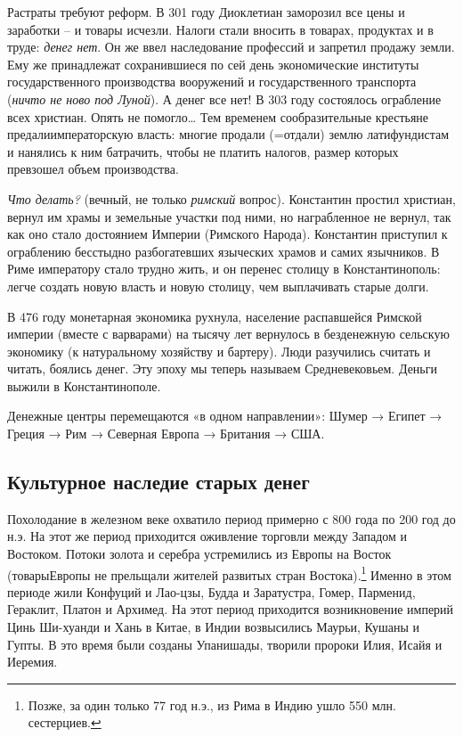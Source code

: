 Растраты требуют \flqq реформ\frqq. В 301 году Диоклетиан заморозил все цены и заработки – и товары
исчезли. Налоги стали вносить в товарах, продуктах и в труде: \flqq \textit{денег нет}\frqq. Он же
ввел наследование профессий и запретил продажу земли. Ему же принадлежат сохранившиеся по сей день экономические
институты государственного производства вооружений и государственного транспорта (\textit{ничто не ново под Луной}). А
денег все нет! В 303 году состоялось ограбление всех христиан. Опять не помогло… Тем временем сообразительные крестьяне
\flqq предали\frqq императорскую власть: многие продали (=отдали) землю латифундистам и нанялись к
ним батрачить, чтобы не платить налогов, размер которых превзошел объем производства.


\textit{Что делать?} (вечный, не только \textit{римский} вопрос). Константин простил христиан, вернул им храмы и
земельные участки под ними, но награбленное не вернул, так как оно стало достоянием Империи (Римского Народа).
Константин приступил к ограблению бесстыдно разбогатевших языческих храмов и самих язычников. В Риме императору стало
трудно жить, и он перенес столицу в Константинополь: легче создать новую власть и новую столицу, чем выплачивать старые
долги.


В 476 году монетарная экономика рухнула, население распавшейся Римской империи (вместе с варварами) на тысячу лет
вернулось в безденежную сельскую экономику (к натуральному хозяйству и бартеру). Люди разучились считать и читать,
боялись денег. Эту эпоху мы теперь называем Средневековьем. Деньги выжили в Константинополе.


Денежные центры перемещаются «в одном направлении»: Шумер → Египет → Греция → Рим → Северная Европа → Британия → США.

\subsection[Культурное наследие старых денег]{Культурное наследие старых денег}

Похолодание в железном веке охватило период примерно с 800 года по 200 год до н.э. На этот же период приходится
оживление торговли между Западом и Востоком. Потоки золота и серебра устремились из Европы на Восток
(\flqq товары\frqq Европы не прельщали жителей развитых стран
Востока).\footnote{Позже, за один только 77 год н.э., из Рима в Индию ушло 550 млн. сестерциев.}
Именно в этом периоде жили Конфуций и Лао-цзы, Будда и Заратустра, Гомер, Парменид, Гераклит, Платон и Архимед. На этот
период приходится возникновение империй Цинь Ши-хуанди и Хань в Китае, в Индии возвысились Маурьи, Кушаны и Гупты. В
это время были созданы Упанишады, творили пророки Илия, Исайя и Иеремия.


